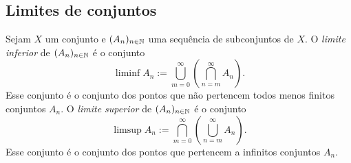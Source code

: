 

\subsection{Limites de conjuntos}

\begin{definition}
	Sejam $X$ um conjunto e $(A_n)_{n \in \mathbb{N}}$ uma sequência de subconjuntos de $X$. O \emph{limite inferior} de $(A_n)_{n \in \mathbb{N}}$ é o conjunto
	\begin{equation*}
	\liminf A_n := \bigcup_{m=0}^\infty \left( \bigcap_{n=m}^\infty A_n \right).
	\end{equation*}
	Esse conjunto é o conjunto dos pontos que não pertencem todos menos finitos conjuntos $A_n$.
O \emph{limite superior} de $(A_n)_{n \in \mathbb{N}}$ é o conjunto
	\begin{equation*}
	\limsup A_n := \bigcap_{m=0}^\infty \left( \bigcup_{n=m}^\infty A_n \right).
	\end{equation*}
	Esse conjunto é o conjunto dos pontos que pertencem a infinitos conjuntos $A_n$.
\end{definition}

